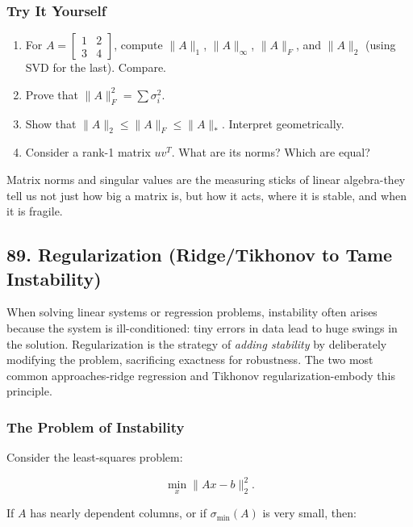 \documentclass[
  letterpaper,
  DIV=11,
  numbers=noendperiod]{scrreprt}
\providecommand{\tightlist}{%
  \setlength{\itemsep}{0pt}\setlength{\parskip}{0pt}}
\begin{document}
\subsubsection{Try It Yourself}\label{try-it-yourself-87}

\begin{enumerate}
\def\labelenumi{\arabic{enumi}.}
\tightlist
\item
  For \(A = \begin{bmatrix}1 & 2 \\ 3 & 4\end{bmatrix}\), compute
  \(\|A\|_1\), \(\|A\|_\infty\), \(\|A\|_F\), and \(\|A\|_2\) (using SVD
  for the last). Compare.
\item
  Prove that \(\|A\|_F^2 = \sum \sigma_i^2\).
\item
  Show that \(\|A\|_2 \leq \|A\|_F \leq \|A\|_*\). Interpret
  geometrically.
\item
  Consider a rank-1 matrix \(uv^T\). What are its norms? Which are
  equal?
\end{enumerate}

Matrix norms and singular values are the measuring sticks of linear
algebra-they tell us not just how big a matrix is, but how it acts,
where it is stable, and when it is fragile.

\subsection{89. Regularization (Ridge/Tikhonov to Tame
Instability)}\label{regularization-ridgetikhonov-to-tame-instability}

When solving linear systems or regression problems, instability often
arises because the system is ill-conditioned: tiny errors in data lead
to huge swings in the solution. Regularization is the strategy of
\emph{adding stability} by deliberately modifying the problem,
sacrificing exactness for robustness. The two most common
approaches-ridge regression and Tikhonov regularization-embody this
principle.

\subsubsection{The Problem of
Instability}\label{the-problem-of-instability}

Consider the least-squares problem:

\[
\min_x \|Ax - b\|_2^2.
\]

If \(A\) has nearly dependent columns, or if \(\sigma_{\min}(A)\) is
very small, then:
\end{document}
